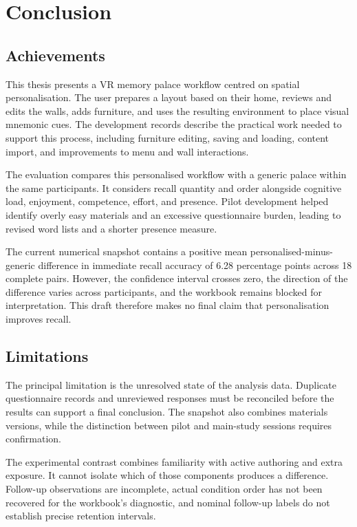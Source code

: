 \chapter{Conclusion}
\label{chap:concl}

\section{Achievements}
This thesis presents a VR memory palace workflow centred on spatial personalisation. The user prepares a layout based on their home, reviews and edits the walls, adds furniture, and uses the resulting environment to place visual mnemonic cues. The development records describe the practical work needed to support this process, including furniture editing, saving and loading, content import, and improvements to menu and wall interactions.

The evaluation compares this personalised workflow with a generic palace within the same participants. It considers recall quantity and order alongside cognitive load, enjoyment, competence, effort, and presence. Pilot development helped identify overly easy materials and an excessive questionnaire burden, leading to revised word lists and a shorter presence measure.

The current numerical snapshot contains a positive mean personalised-minus-generic difference in immediate recall accuracy of 6.28 percentage points across 18 complete pairs. However, the confidence interval crosses zero, the direction of the difference varies across participants, and the workbook remains blocked for interpretation. This draft therefore makes no final claim that personalisation improves recall.

\section{Limitations}
The principal limitation is the unresolved state of the analysis data. Duplicate questionnaire records and unreviewed responses must be reconciled before the results can support a final conclusion. The snapshot also combines materials versions, while the distinction between pilot and main-study sessions requires confirmation.

The experimental contrast combines familiarity with active authoring and extra exposure. It cannot isolate which of those components produces a difference. Follow-up observations are incomplete, actual condition order has not been recovered for the workbook's diagnostic, and nominal follow-up labels do not establish precise retention intervals.

